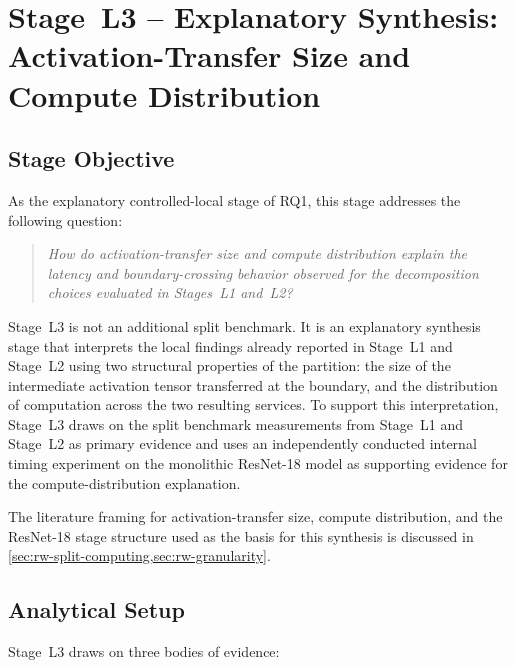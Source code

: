 \section{Stage~L3 -- Explanatory Synthesis: Activation-Transfer Size and Compute Distribution}
\label{sec:rq13}

\subsection{Stage Objective}

As the explanatory controlled-local stage of RQ1, this stage addresses the following question:

\begin{quote}
\textit{How do activation-transfer size and compute distribution explain the latency and boundary-crossing behavior observed for the decomposition choices evaluated in Stages~L1 and~L2?}
\end{quote}

Stage~L3 is not an additional split benchmark. It is an explanatory synthesis stage that interprets the local findings already reported in Stage~L1 and Stage~L2 using two structural properties of the partition: the size of the intermediate activation tensor transferred at the boundary, and the distribution of computation across the two resulting services. To support this interpretation, Stage~L3 draws on the split benchmark measurements from Stage~L1 and Stage~L2 as primary evidence and uses an independently conducted internal timing experiment on the monolithic ResNet-18 model as supporting evidence for the compute-distribution explanation.

The literature framing for activation-transfer size, compute distribution, and
the ResNet-18 stage structure used as the basis for this synthesis is
discussed in \cref{sec:rw-split-computing,sec:rw-granularity}.

\subsection{Analytical Setup}
\label{sec:rq13-setup}

Stage~L3 draws on three bodies of evidence:

